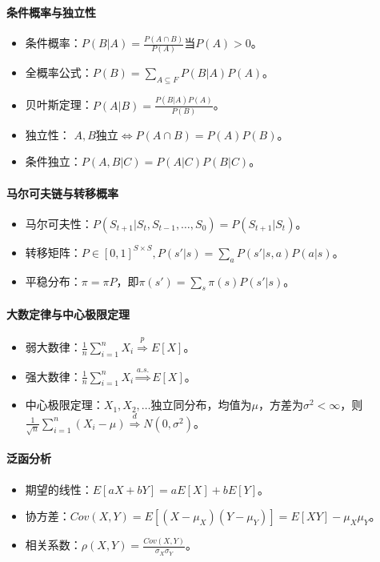 \documentclass[
12pt, %
a4paper, 
oneside, %
headinclude,footinclude, %
]{scrartcl}
\begin{document}
\paragraph*{条件概率与独立性}
\begin{itemize}
\item 条件概率：$ P(B|A) = \frac{P(A \cap B)}{P(A)}$当$ P(A) > 0 $。
\item 全概率公式：$ P(B) = \sum_{A \subseteq F} P(B|A) P(A) $。
\item 贝叶斯定理：$ P(A|B) = \frac{P(B|A) P(A)}{P(B)} $。
\item 独立性： $ A,B $独立$ \iff P(A \cap B) = P(A)P(B) $。
\item 条件独立：$ P(A ,B|C) = P(A|C)P(B|C) $。
\end{itemize}
\paragraph*{马尔可夫链与转移概率}
\begin{itemize}
\item 马尔可夫性：$ P(S_{t + 1}|S_t, S_{t - 1}, \dots, S_0) = P(S_{t + 1}|S_t) $。
\item 转移矩阵：$ P \in [0, 1]^{S \times S}, P(s'|s) = \sum_{a} P(s'|s, a) P(a|s) $。
\item 平稳分布：$ \pi = \pi P $，即$ \pi(s') = \sum_{s} \pi(s) P(s'|s) $。
\end{itemize}
\paragraph*{大数定律与中心极限定理}
\begin{itemize}
\item 弱大数律：$ \frac{1}{n} \sum_{i=1}^n X_i \overset{p}{\Longrightarrow} E[X] $。
\item 强大数律：$ \frac{1}{n} \sum_{i=1}^n X_i \overset{a.s.}{\Longrightarrow} E[X] $。
\item 中心极限定理：$ X_1, X_2, \dots $独立同分布，均值为$ \mu $，方差为$ \sigma^2 < \infty $，则$ \frac{1}{\sqrt{n}} \sum_{i=1}^n (X_i - \mu) \overset{d}{\Longrightarrow} N(0, \sigma^2) $。
\end{itemize}
\paragraph*{泛函分析}
\begin{itemize}
\item 期望的线性：$ E[aX + bY] = a E[X] + b E[Y] $。
\item 协方差：$ Cov(X, Y) = E[(X - \mu_X)(Y - \mu_Y)] = E[XY] - \mu_X \mu_Y $。
\item 相关系数：$ \rho(X, Y) = \frac{Cov(X, Y)}{\sigma_X \sigma_Y} $。
\end{itemize}
\end{document}
